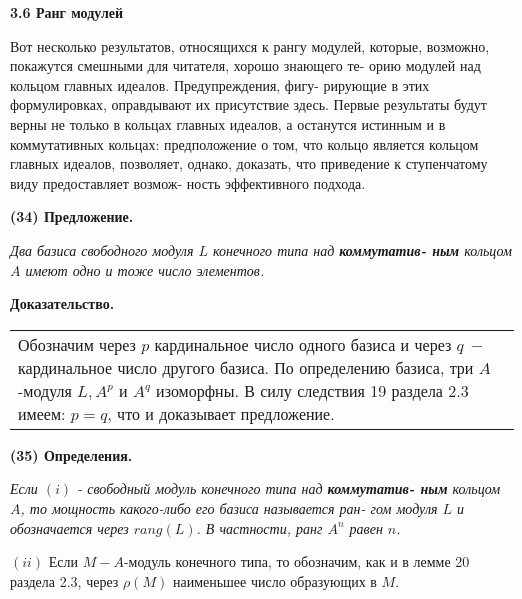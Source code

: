 	\pagebreak
	
	
	\noindent
	{\large {\bf 3.6 Ранг модулей}}
	
	\noindent
	Вот несколько результатов, относящихся к рангу модулей, которые,\linebreak
	возможно, покажутся смешными для читателя, хорошо знающего те-\linebreak
	орию модулей над кольцом главных идеалов. Предупреждения, фигу-\linebreak
	рирующие в этих формулировках, оправдывают их присутствие здесь.\linebreak
	Первые результаты будут верны не только в кольцах главных идеалов,\linebreak
	а останутся истинным и в коммутативных кольцах: предположение о\linebreak
	том, что кольцо является кольцом главных идеалов, позволяет, однако,\linebreak
	доказать, что приведение к ступенчатому виду предоставляет возмож-\linebreak
	ность эффективного подхода.
	
	\noindent
	{\bf (34) Предложение.}
	
	{\it Два базиса свободного модуля $L$ конечного типа над {\bf коммутатив-\linebreak
	ным} кольцом $A$ имеют одно и тоже число элементов.}
	
	\noindent
	{\bf Доказательство.}
	
	\begin{tabular}{|p{12.5cm}}
	\noindent
	Обозначим через $p$ кардинальное число одного базиса и через $q \ - $\linebreak
	кардинальное число другого базиса. По определению базиса, три\linebreak
	$A$-модуля $L, A^p$ и $A^q$ изоморфны. В силу следствия 19 раздела 2.3\linebreak
	имеем: $p = q$, что и доказывает предложение.
	\end{tabular}
	
	\noindent
	{\bf (35) Определения.}
	
	{\it Если $(i)$ - свободный модуль конечного типа над {\bf коммутатив-\linebreak
	ным} кольцом $A$, то мощность какого-либо его базиса называется ран-\linebreak
	гом модуля $L$ и обозначается через $rang(L)$. В частности, ранг $A^n$ равен\linebreak
	$n$.
	
	$(ii)$ Если $M - A$-модуль конечного типа, то обозначим, как и в\linebreak
	лемме 20 раздела 2.3, через $\rho(M)$ наименьшее число образующих в $M$.}
	
